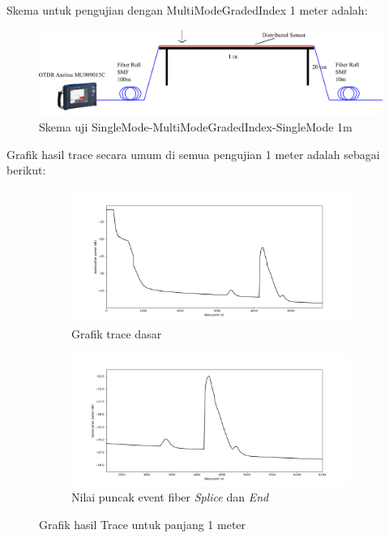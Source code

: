 \documentclass[12pt]{article}
\begin{document}
	Skema untuk pengujian dengan MultiModeGradedIndex 1 meter adalah:
	
	\begin{figure}[!ht]
		\centering
		\captionsetup{justification=centering}
		\includegraphics[width=0.7\linewidth]{images/Bab_4/uji_1m}
		\caption[Trace SMF-SMF]{\small{Skema uji SingleMode-MultiModeGradedIndex-SingleMode 1m}}
	\end{figure}
	
	Grafik hasil trace secara umum di semua pengujian 1 meter adalah sebagai berikut:
	
	\begin{figure}[!ht]
		\centering
		\captionsetup{justification=centering}
		\begin{subfigure}[h]{0.8\textwidth}
			\includegraphics[width=\textwidth]{images/Bab_4/Bab_4_5d1}	
			\caption{\small{Grafik trace dasar}}		
		\end{subfigure}
		\begin{subfigure}[h]{0.8\textwidth}
			\includegraphics[width=\linewidth]{images/Bab_4/Bab_4_5d2}
			\caption{\small{Nilai puncak event fiber \textit{Splice} dan \textit{End}}}			
		\end{subfigure}
		\caption[Uji Pagar]{\small{Grafik hasil Trace untuk panjang 1 meter}}
	\end{figure}
\end{document}
